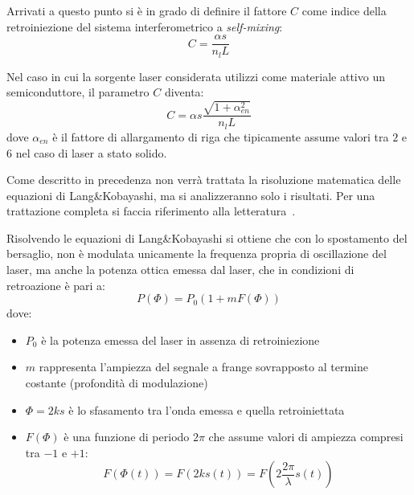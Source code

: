Arrivati a questo punto si è in grado di definire il fattore $C$ come indice della retroiniezione del sistema interferometrico a \textit{self-mixing}:
\begin{equation}
	C = \frac{\alpha s}{n_l L}
\end{equation}

Nel caso in cui la sorgente laser considerata utilizzi come materiale attivo un semiconduttore, il parametro $C$ diventa:
\begin{equation}
	C=\alpha s \frac{\sqrt{1+\alpha_{en}^2}}{n_l L}
\end{equation}
dove $\alpha_{en}$ è il fattore di allargamento di riga che tipicamente assume valori tra $2$ e $6$ nel caso di laser a stato solido.

Come descritto in precedenza non verrà trattata la risoluzione matematica delle equazioni di Lang\&Kobayashi, ma si analizzeranno solo i risultati. Per una trattazione completa si faccia riferimento alla letteratura~\cite{1070479}.

Risolvendo le equazioni di Lang\&Kobayashi si ottiene che con lo spostamento del bersaglio, non è modulata unicamente la frequenza propria di oscillazione del laser, ma anche la potenza ottica emessa dal laser, che in condizioni di retroazione è pari a:
\begin{equation}
	P(\Phi)=P_0(1+mF(\Phi))
\end{equation}
dove:
\begin{itemize}
	\item $P_0$ è la potenza emessa del laser in assenza di retroiniezione 
	\item $m$ rappresenta l'ampiezza del segnale a frange sovrapposto al termine costante (profondità di modulazione)
	\item $\Phi = 2ks$ è lo sfasamento tra l'onda emessa e quella retroiniettata 
	\item $F(\Phi)$ è una funzione di periodo $2\pi$ che assume valori di ampiezza compresi tra $-1$ e $+1$:
		\begin{equation}
			F(\Phi(t))=F(2ks(t))=F(2\frac{2\pi}{\lambda}s(t))
		\end{equation}
\end{itemize}

